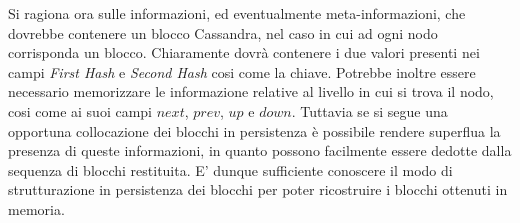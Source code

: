 		Si ragiona ora sulle informazioni, ed eventualmente meta-informazioni, che dovrebbe contenere un blocco Cassandra, nel caso in cui ad ogni nodo corrisponda un blocco. Chiaramente dovrà contenere i due valori presenti nei campi \textit{First Hash} e \textit{Second Hash} cosi come la chiave. Potrebbe inoltre essere necessario memorizzare le informazione relative al livello in cui si trova il nodo, cosi come ai suoi campi $ next $, $ prev $, $ up $ e $ down $. Tuttavia se si segue una opportuna collocazione dei blocchi in persistenza è possibile rendere superflua la presenza di queste informazioni, in quanto possono facilmente essere dedotte dalla sequenza di blocchi restituita. E' dunque sufficiente conoscere il modo di strutturazione in persistenza dei blocchi per poter ricostruire i blocchi ottenuti in memoria.
		
